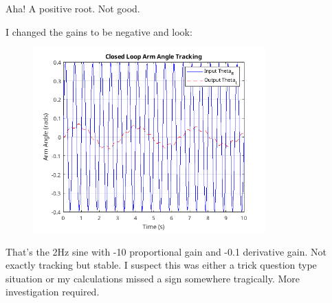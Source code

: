 \documentclass{article}
\begin{document}
Aha! A positive root. Not good.

I changed the gains to be negative and look:

\begin{figure}[H]
    \centering
    \includegraphics[width=0.8\textwidth]{negativeGain.png}
\end{figure}

That's the 2Hz sine with -10 proportional gain and -0.1 derivative gain.
Not exactly tracking but stable.
I suspect this was either a trick question type situation or my calculations missed a sign somewhere tragically.
More investigation required.
\end{document}
